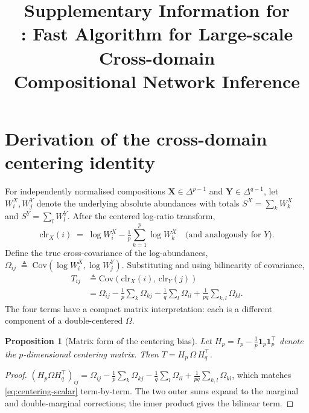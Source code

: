 \documentclass[11pt]{article}
\title{Supplementary Information for\\
\falcon: Fast Algorithm for Large-scale Cross-domain\\
Compositional Network Inference}
\author{}
\date{}
\newcommand{\Cov}{\mathrm{Cov}}
\newcommand{\clr}{\mathrm{clr}}
\newcommand{\bfX}{\mathbf{X}}
\newcommand{\bfY}{\mathbf{Y}}
\theoremstyle{plain}
\newtheorem{proposition}{Proposition}
\begin{document}
\maketitle

\tableofcontents
\vspace{1em}

\section{Derivation of the cross-domain centering identity}
\label{sec:derivation}

For independently normalised compositions $\bfX \in \Delta^{p-1}$ and
$\bfY \in \Delta^{q-1}$, let $W_i^X, W_j^Y$ denote the underlying absolute
abundances with totals $S^X = \sum_k W_k^X$ and $S^Y = \sum_l W_l^Y$. After
the centered log-ratio transform,
\begin{equation}
\clr_X(i) \;=\; \log W_i^X - \tfrac{1}{p}\sum_{k=1}^{p}\log W_k^X
\quad\text{(and analogously for $Y$).}
\end{equation}
Define the true cross-covariance of the log-abundances,
$\Omega_{ij} \;\triangleq\; \Cov(\log W_i^X, \log W_j^Y)$.
Substituting and using bilinearity of covariance,
\begin{align}
T_{ij} &\triangleq \Cov(\clr_X(i),\, \clr_Y(j)) \nonumber \\
       &= \Omega_{ij}
        - \tfrac{1}{p}\sum_{k} \Omega_{kj}
        - \tfrac{1}{q}\sum_{l} \Omega_{il}
        + \tfrac{1}{pq}\sum_{k,l}\Omega_{kl}. \label{eq:centering-scalar}
\end{align}
The four terms have a compact matrix interpretation: each is a different
component of a double-centered $\Omega$.

\begin{proposition}[Matrix form of the centering bias]\label{prop:matrix}
Let $H_p = I_p - \tfrac{1}{p}\mathbf{1}_p\mathbf{1}_p^\top$ denote the
$p$-dimensional centering matrix. Then
$T = H_p\,\Omega\,H_q^\top$.
\end{proposition}

\begin{proof}
$(H_p \Omega H_q^\top)_{ij}
= \Omega_{ij} - \tfrac{1}{p}\sum_k\Omega_{kj} - \tfrac{1}{q}\sum_l\Omega_{il}
+ \tfrac{1}{pq}\sum_{k,l}\Omega_{kl}$,
which matches \eqref{eq:centering-scalar} term-by-term. The two outer sums
expand to the marginal and double-marginal corrections; the inner product
gives the bilinear term.
\end{proof}
\end{document}
